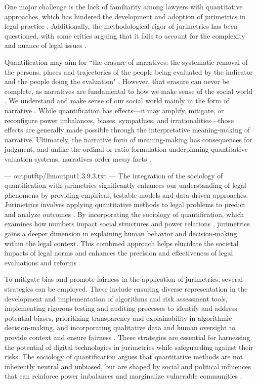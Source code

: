 One major challenge is the lack of familiarity among lawyers with quantitative approaches, which has hindered the development and adoption of jurimetrics in legal practice \cite{l2010de}. Additionally, the methodological rigor of jurimetrics has been questioned, with some critics arguing that it fails to account for the complexity and nuance of legal issues \cite{nunes2016jurimetria}.

Quantification may aim for “the erasure of narratives: the systematic removal of the persons, places and trajectories of the people being evaluated by the indicator and the people doing the evaluation" \cite{101111lsi12334}. However, that erasure can never be complete, as narratives are fundamental to how we make sense of the social world \cite{bruner1991, ewick2003}. We understand and make sense of our social world mainly in the form of narrative \cite{bruner1991}. While quantification has effects—it may amplify, mitigate, or reconfigure power imbalances, biases, sympathies, and irrationalities—those effects are generally made possible through the interpretative meaning-making of narrative. Ultimately, the narrative form of meaning-making has consequences for judgment, and unlike the ordinal or ratio formulation underpinning quantitative valuation systems, narratives order messy facts \cite{101111lsi12334}.


---
outputftp/llmoutput1.3.9.3.txt
---
The integration of the sociology of quantification with jurimetrics significantly enhances our understanding of legal phenomena by providing empirical, testable models and data-driven approaches. Jurimetrics involves applying quantitative methods to legal problems to predict and analyze outcomes \cite{de2010,zabala2019,nunes2018}. By incorporating the sociology of quantification, which examines how numbers impact social structures and power relations \cite{paiva2021}, jurimetrics gains a deeper dimension in explaining human behavior and decision-making within the legal context. This combined approach helps elucidate the societal impacts of legal norms and enhances the precision and effectiveness of legal evaluations and reforms \cite{nunes2018,nunes2018a}.

To mitigate bias and promote fairness in the application of jurimetrics, several strategies can be employed. These include ensuring diverse representation in the development and implementation of algorithms and risk assessment tools, implementing rigorous testing and auditing processes to identify and address potential biases, prioritizing transparency and explainability in algorithmic decision-making, and incorporating qualitative data and human oversight to provide context and ensure fairness \cite{10.1007/s11186-021-09453-1,unger2021process}. These strategies are essential for harnessing the potential of digital technologies in jurimetrics while safeguarding against their risks. The sociology of quantification argues that quantitative methods are not inherently neutral and unbiased, but are shaped by social and political influences that can reinforce power imbalances and marginalize vulnerable communities \cite{10.1590/dados.2022.65.3.267,1023071190721}.

